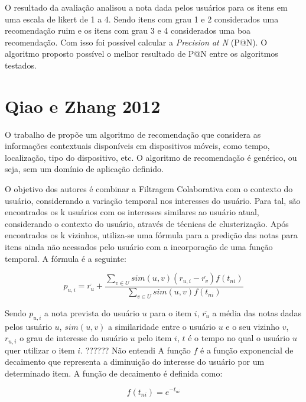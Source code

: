 O resultado da avaliação analisou a nota dada pelos usuários para os itens em uma escala de likert de 1 a 4. Sendo itens
com grau 1 e 2 considerados uma recomendação ruim e os itens com grau 3 e 4 considerados uma boa recomendação. Com isso
foi possível calcular a \textit{Precision at N} (P@N). O algoritmo proposto possível o melhor resultado de P@N entre os
algoritmos testados.

\section{Qiao e Zhang 2012}

O trabalho de  propõe um algoritmo de recomendação que considera as informações
contextuais disponíveis em dispositivos móveis, como tempo, localização, tipo do dispositivo, etc. O algoritmo de
recomendação é genérico, ou seja, sem um domínio de aplicação definido.

O objetivo dos autores é combinar a Filtragem Colaborativa com o contexto do usuário, considerando a variação temporal
nos interesses do usuário. Para tal, são encontrados os k usuários com os interesses similares ao usuário atual,
considerando o contexto do usuário, através de técnicas de clusterização. Após encontrados os k vizinhos, utiliza-se
uma fórmula para a predição das notas para itens ainda não acessados pelo usuário com a incorporação de uma função
temporal. A fórmula é a seguinte:

\begin{equation}
  p_{u,i} = \overline{r_u} + \frac{\sum_{v \in U}{sim(u, v)(r_{u,i} - \overline{r_v})f(t_{ni})}}{\sum_{v \in U}{sim(u, v)f(t_{ni})}}
  \label{eq:qiao-predicao}
\end{equation}

Sendo $p_{u,i}$ a nota prevista do usuário $u$ para o item $i$, $\overline{r_u}$ a média das notas dadas pelos usuário
$u$, $sim(u, v)$ a similaridade entre o usuário $u$ e o seu vizinho $v$, $r_{u,i}$ o grau de interesse do usuário $u$
pelo item $i$, $t$ é o tempo no qual o usuário $u$ quer utilizar o item $i$. ?????? Não entendi A função $f$ é a função
exponencial de decaimento que representa a diminuição do interesse do usuário por um determinado item. A função de
decaimento é definida como:

\begin{equation}
  f(t_{ni}) = e^{-t_{ni}}
  \label{eq:qiao-funcao-decaimento}
\end{equation}


